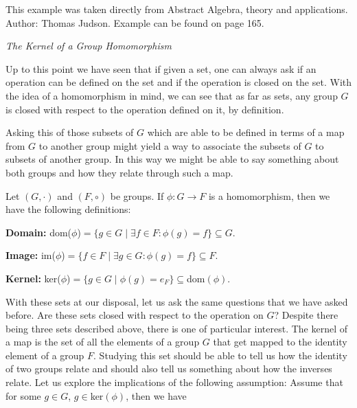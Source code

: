 \documentclass[12pt, a4paper]{article}
\begin{document}
\begin{flushleft}
    
    \footnotesize *This example was taken directly from Abstract Algebra, theory and applications. Author: Thomas Judson. Example can be found on page 165.
    
\end{flushleft}

\begin{flushleft}

    \textit{\large{The Kernel of a Group Homomorphism}}

\end{flushleft}

    Up to this point we have seen that if given a set, one can always ask if an operation can be defined on the set and if the operation is closed on the set. With the idea of a homomorphism in mind, we can see that as far as sets, any group $G$ is closed with respect to the operation defined on it, by definition.\par
    
    Asking this of those subsets of $G$ which are able to be defined in terms of a map from $G$ to another group might yield a way to associate the subsets of $G$ to subsets of another group. In this way we might be able to say something about both groups and how they relate through such a map.
    
\vspace{4mm}

    Let $(G,\cdot)$ and $(F,\circ)$ be groups. If $\phi\colon G\rightarrow F$ is a homomorphism, then we have the following definitions:\par
    
\begin{description}

    \item \textbf{Domain: }dom($\phi$)$=\{g\in G\mid\exists f\in F\colon\phi(g)=f\}\subseteq G$.

    \item \textbf{Image: }im($\phi$)$=\{f\in F\mid\exists g\in G\colon \phi(g)=f\}\subseteq F$.
    
    \item \textbf{Kernel: }ker($\phi$)$=\{g\in G\mid\phi(g)=e_F\}\subseteq$dom$(\phi)$.

\end{description}

    With these sets at our disposal, let us ask the same questions that we have asked before. Are these sets closed with respect to the operation on $G$? Despite there being three sets described above, there is one of particular interest. The kernel of a map is the set of all the elements of a group $G$ that get mapped to the identity element of a group $F$. Studying this set should be able to tell us how the identity of two groups relate and should also tell us something about how the inverses relate. Let us explore the implications of the following assumption: Assume that for some $g\in G$, $g\in$ker$(\phi)$, then we have\par
    
\end{document}
